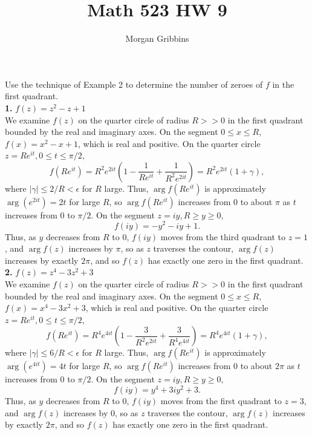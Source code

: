 \documentclass[12pt,letterpaper]{article}
\title{Math 523 HW 9}
\author{Morgan Gribbins}
\date{}
\begin{document}
	
\maketitle

Use the technique of Example 2 to determine the number of zeroes of \(f\) in the first quadrant. \\

\textbf{1.} \(f(z) = z^{2} - z + 1\) \\

We examine \(f(z)\) on the quarter circle of radius \(R >> 0\) in the first quadrant bounded by the real and imaginary axes. On the segment \(0 \leq x \leq R\), \(f(x) = x^{2} - x + 1\), which is real and positive. On the quarter circle \(z = Re^{it}, 0 \leq t \leq \pi/2\), \[f(Re^{it}) = R^{2}e^{2it}\left(1 - \frac{1}{Re^{it}} + \frac{1}{R^{2}e^{2it}}\right) = R^{2}e^{2it}(1+\gamma),\] where \(|\gamma| \leq 2/R < \epsilon\) for \(R\) large. Thus, \(\arg f(Re^{it})\) is approximately \(\arg  (e^{2it}) = 2t\) for large \(R\), so \(\arg f(Re^{it})\) increases from \(0\) to about \(\pi\) as \(t\) increases from \(0\) to \(\pi/2\). On the segment \(z=iy, R \geq y \geq 0\), \[f(iy) = -y^{2} - iy + 1.\] Thus, as \(y\) decreases from \(R\) to \(0\), \(f(iy)\) moves from the third quadrant to \(z = 1\), and \(\arg f(z)\) increases by \(\pi\), so as \(z\) traverses the contour, \(\arg f(z)\) increases by exactly \(2\pi\), and so \(f(z)\) has exactly one zero in the first quadrant. \\

\textbf{2.} \(f(z) = z^{4} - 3z^{2} + 3\) \\

We examine \(f(z)\) on the quarter circle of radius \(R >> 0\) in the first quadrant bounded by the real and imaginary axes. On the segment \(0 \leq x \leq R\), \(f(x) = x^{4} - 3x^{2} + 3\), which is real and positive. On the quarter circle \(z = Re^{it}, 0 \leq t \leq \pi/2\), \[f(Re^{it}) = R^{4}e^{4it}\left(1 - \frac{3}{R^{2}e^{2it}} + \frac{3}{R^{4}e^{4it}}\right) = R^{4}e^{4it}(1+\gamma),\] where \(|\gamma| \leq 6/R < \epsilon\) for \(R\) large. Thus, \(\arg f(Re^{it})\) is approximately \(\arg  (e^{4it}) = 4t\) for large \(R\), so \(\arg f(Re^{it})\) increases from \(0\) to about \(2\pi\) as \(t\) increases from \(0\) to \(\pi/2\). On the segment \(z=iy, R \geq y \geq 0\), \[f(iy) = y^{4} + 3iy^{2} + 3.\] Thus, as \(y\) decreases from \(R\) to \(0\), \(f(iy)\) moves from the first quadrant to \(z = 3\), and \(\arg f(z)\) increases by \(0\), so as \(z\) traverses the contour, \(\arg f(z)\) increases by exactly \(2\pi\), and so \(f(z)\) has exactly one zero in the first quadrant. \\
\end{document}

